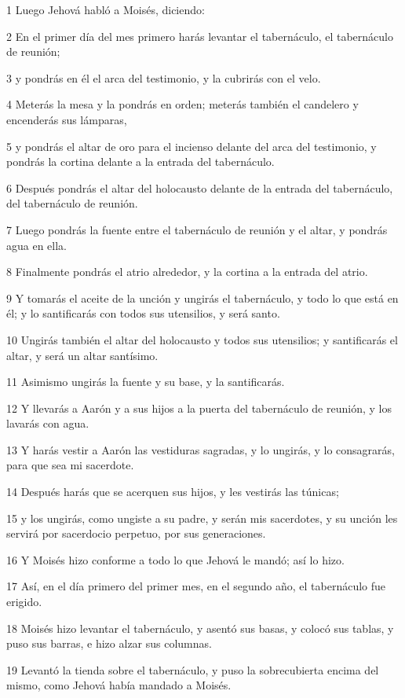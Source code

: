 \par 1 Luego Jehová habló a Moisés, diciendo:
\par 2 En el primer día del mes primero harás levantar el tabernáculo, el tabernáculo de reunión;
\par 3 y pondrás en él el arca del testimonio, y la cubrirás con el velo.
\par 4 Meterás la mesa y la pondrás en orden; meterás también el candelero y encenderás sus lámparas,
\par 5 y pondrás el altar de oro para el incienso delante del arca del testimonio, y pondrás la cortina delante a la entrada del tabernáculo.
\par 6 Después pondrás el altar del holocausto delante de la entrada del tabernáculo, del tabernáculo de reunión.
\par 7 Luego pondrás la fuente entre el tabernáculo de reunión y el altar, y pondrás agua en ella.
\par 8 Finalmente pondrás el atrio alrededor, y la cortina a la entrada del atrio.
\par 9 Y tomarás el aceite de la unción y ungirás el tabernáculo, y todo lo que está en él; y lo santificarás con todos sus utensilios, y será santo.
\par 10 Ungirás también el altar del holocausto y todos sus utensilios; y santificarás el altar, y será un altar santísimo.
\par 11 Asimismo ungirás la fuente y su base, y la santificarás.
\par 12 Y llevarás a Aarón y a sus hijos a la puerta del tabernáculo de reunión, y los lavarás con agua.
\par 13 Y harás vestir a Aarón las vestiduras sagradas, y lo ungirás, y lo consagrarás, para que sea mi sacerdote.
\par 14 Después harás que se acerquen sus hijos, y les vestirás las túnicas;
\par 15 y los ungirás, como ungiste a su padre, y serán mis sacerdotes, y su unción les servirá por sacerdocio perpetuo, por sus generaciones.
\par 16 Y Moisés hizo conforme a todo lo que Jehová le mandó; así lo hizo.
\par 17 Así, en el día primero del primer mes, en el segundo año, el tabernáculo fue erigido.
\par 18 Moisés hizo levantar el tabernáculo, y asentó sus basas, y colocó sus tablas, y puso sus barras, e hizo alzar sus columnas.
\par 19 Levantó la tienda sobre el tabernáculo, y puso la sobrecubierta encima del mismo, como Jehová había mandado a Moisés.
